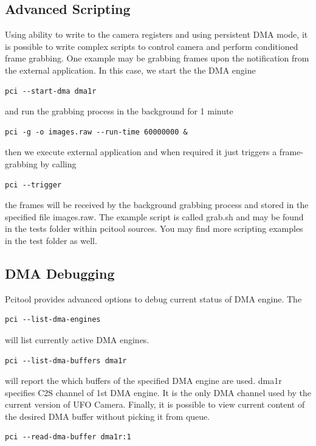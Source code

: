 \clearpage


\subsection{Advanced Scripting}
Using ability to write to the camera registers and using persistent DMA mode, it is possible to write complex scripts to control camera and perform conditioned frame grabbing. One example may be grabbing frames upon the notification from the external application. In this case, we start the the DMA engine
\begin{verbatim}
pci --start-dma dma1r
\end{verbatim}

and run the grabbing process in the background for 1 minute
\begin{verbatim}
pci -g -o images.raw --run-time 60000000 &
\end{verbatim}

then we execute external application and when required it just triggers a frame-grabbing by calling
\begin{verbatim}
pci --trigger
\end{verbatim}

the frames will be received by the background grabbing process and stored in the specified file images.raw. The example script is  called grab.sh and may be found  in the tests folder within pcitool sources. You may find more scripting examples in the test folder as well.

\subsection{DMA Debugging}
Pcitool provides advanced options to debug current status of DMA engine. The 
\begin{verbatim}
pci --list-dma-engines
\end{verbatim}

will list currently active DMA engines. 
\begin{verbatim}
pci --list-dma-buffers dma1r
\end{verbatim}
will report the which buffers of the specified DMA engine are used. dma1r specifies C2S channel of 1st DMA engine. It is the only DMA channel used by the current version of UFO Camera. Finally, it is possible to view current content of the desired DMA buffer without picking it from queue.
\begin{verbatim}
pci --read-dma-buffer dma1r:1
\end{verbatim}


